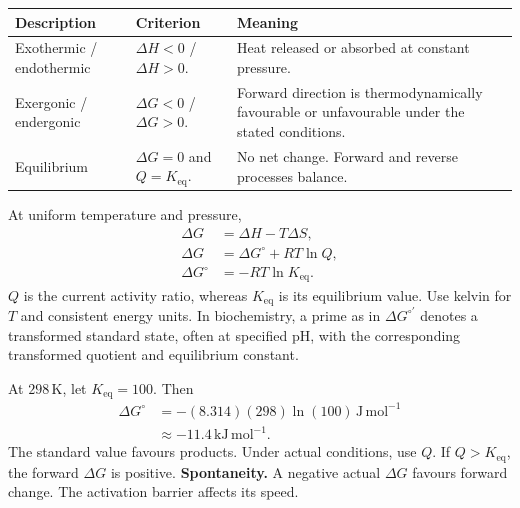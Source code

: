 \documentclass[12pt,a4paper]{article}
\begin{document}
\par\vspace{5pt}
\begingroup
\setlength{\extrarowheight}{1pt}
\noindent\begin{tabularx}{\linewidth}{|B{3.25cm}|Y|Y|}
\hline
\textbf{Description} & \textbf{Criterion} & \textbf{Meaning} \\ \hline
Exothermic / endothermic & $\Delta H<0$ / $\Delta H>0$. & Heat released or absorbed at constant pressure. \\ \hline
Exergonic / endergonic & $\Delta G<0$ / $\Delta G>0$. & Forward direction is thermodynamically favourable or unfavourable under the stated conditions. \\ \hline
Equilibrium & $\Delta G=0$ and $Q=K_{\mathrm{eq}}$. & No net change. Forward and reverse processes balance. \\ \hline
\end{tabularx}\par
\endgroup
\begin{tcolorbox}[formulabox, title={Actual and standard free energy}]
At uniform temperature and pressure,
\[
\begin{aligned}
\Delta G&=\Delta H-T\Delta S,\\
\Delta G&=\Delta G^\circ+RT\ln Q,\\
\Delta G^\circ&=-RT\ln K_{\mathrm{eq}} .
\end{aligned}
\]
$Q$ is the current activity ratio, whereas $K_{\mathrm{eq}}$ is its equilibrium value. Use kelvin for $T$ and consistent energy units. In biochemistry, a prime as in $\Delta G^{\circ\prime}$ denotes a transformed standard state, often at specified pH, with the corresponding transformed quotient and equilibrium constant.
\end{tcolorbox}

\begin{tcolorbox}[examplebox, title={Calculate a standard free energy}]
At $298\,\mathrm K$, let $K_{\mathrm{eq}}=100$. Then
\[
\begin{aligned}
\Delta G^\circ
  &=-(8.314)(298)\ln(100)\,\mathrm{J\,mol^{-1}}\\
  &\approx -11.4\,\mathrm{kJ\,mol^{-1}} .
\end{aligned}
\]
The standard value favours products. Under actual conditions, use $Q$. If $Q>K_{\mathrm{eq}}$, the forward $\Delta G$ is positive. \textbf{Spontaneity.} A negative actual $\Delta G$ favours forward change. The activation barrier affects its speed.
\end{tcolorbox}
\end{document}
